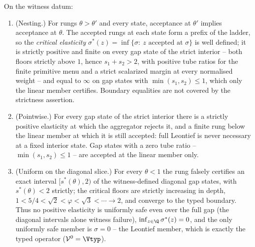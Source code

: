 \begin{theorem}\label{thm:ladder}
On the witness datum:
\begin{enumerate}[label=\textup{(\roman*)},leftmargin=2em]
\item \textup{(Nesting.)} For rungs $\theta>\theta'$ and every state, acceptance at $\theta'$ implies acceptance at $\theta$. The accepted rungs at each state form a prefix of the ladder, so the \emph{critical elasticity} $\sigma^*(z)=\inf\{\sigma:\ z\text{ accepted at }\sigma\}$ is well defined; it is strictly positive and finite on every gap state of the strict interior -- both floors strictly above $1$, hence $s_1+s_2>2$, with positive tube ratios for the finite primitive menu and a strict scalarized margin at every normalised weight -- and equal to $\infty$ on gap states with $\min(s_1,s_2)\le1$, which only the linear member certifies. Boundary equalities are not covered by the strictness assertion.
\item \textup{(Pointwise.)} For every gap state of the strict interior there is a strictly positive elasticity at which the aggregator rejects it, and a finite rung below the linear member at which it is still accepted: full Leontief is never necessary at a fixed interior state. Gap states with a zero tube ratio -- $\min(s_1,s_2)\le1$ -- are accepted at the linear member only.
\item \textup{(Uniform on the diagonal slice.)} For every $\theta<1$ the rung falsely certifies an exact interval $[s^*(\theta),2)$ of the witness-defined diagonal gap states, with $s^*(\theta)<2$ strictly; the critical floors are strictly increasing in depth, $1<5/4<\sqrt2<\varphi<\sqrt3<\cdots\to2$, and converge to the typed boundary. Thus no positive elasticity is uniformly safe even over the full gap (the diagonal intervals alone witness failure), $\inf_{z\in\Q}\sigma^*(z)=0$, and the only uniformly safe member is $\sigma=0$ -- the Leontief member, which is exactly the typed operator ($\mathcal V^{0}=\Vtyp$).
\end{enumerate}
\end{theorem}

